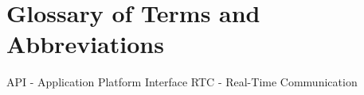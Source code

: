 \section{Glossary of Terms and Abbreviations}
API - Application Platform Interface
RTC - Real-Time Communication
\pagebreak
